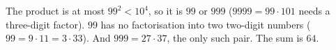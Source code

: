 The product is at most $99^2<10^4$, so it is $99$ or $999$ ($9999=99\cdot101$ needs a three-digit factor). $99$ has no factorisation into two two-digit numbers ($99=9\cdot11=3\cdot33$). And $999=27\cdot37$, the only such pair. The sum is $\boxed{64}$.
